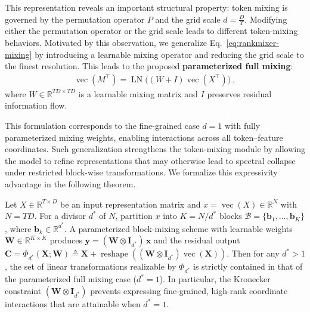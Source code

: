 \documentclass[sigconf,screen]{acmart}
\begin{document}
This representation reveals an important structural property: token mixing is governed by the permutation operator \(P\) and the grid scale \(d = \frac{D}{T}\). 
Modifying either the permutation operator or the grid scale leads to different token-mixing behaviors. 
Motivated by this observation, we generalize Eq.~\ref{eq:rankmixer-mixing} by introducing a learnable mixing operator and reducing the grid scale to the finest resolution. 
This leads to the proposed \textbf{parameterized full mixing}:
\begin{align}
\label{eq:full-mixing}
\operatorname{vec}(M^\top) = \operatorname{LN}\big((W + I)\operatorname{vec}(X^\top)\big)\ ,
\end{align}
where \(W\in\mathbb{R}^{TD\times TD}\) is a learnable mixing matrix and \(I\) preserves residual information flow.

This formulation corresponds to the fine-grained case \(d=1\) with fully parameterized mixing weights, enabling interactions across all token–feature coordinates. 
Such generalization strengthens the token-mixing module by allowing the model to refine representations that may otherwise lead to spectral collapse under restricted block-wise transformations. 
We formalize this expressivity advantage in the following theorem.

\begin{theorem}
\label{thm:parameterized-block-mixing}
Let $X\in\mathbb R^{T\times D}$ be an input representation matrix and $x=\operatorname{vec}(X)\in\mathbb{R}^{N}$ with $N=TD$. For a divisor $d^{\ast}$ of $N$, partition $x$ into $K=N/d^{\ast}$ blocks $\mathcal{B}=\{\mathbf{b}_1,\dots,\mathbf{b}_K\}$, where $\mathbf{b}_k\in\mathbb{R}^{d^{\ast}}$. A parameterized block-mixing scheme with learnable weights $\mathbf{W}\in\mathbb{R}^{K\times K}$ produces \(\mathbf{y}=(\mathbf{W}\otimes\mathbf{I}_{d^{\ast}})\,\mathbf{x} \) and the residual output \(\mathbf{C} =\Phi_{d^{\ast}}(\mathbf{X};\mathbf{W}) \triangleq \mathbf{X} +\operatorname{reshape}\!\left( (\mathbf{W}\otimes\mathbf{I}_{d^{\ast}})\operatorname{vec}(\mathbf{X}) \right).\) Then for any $d^{\ast}>1$, the set of linear transformations realizable by $\Phi_{d^{\ast}}$ is strictly contained in that of the parameterized full mixing case ($d^{\ast}=1$). In particular, the Kronecker constraint $(\mathbf{W}\otimes\mathbf{I}_{d^{\ast}})$ prevents expressing fine-grained, high-rank coordinate interactions that are attainable when $d^{\ast}=1$.
\end{theorem}
\end{document}
